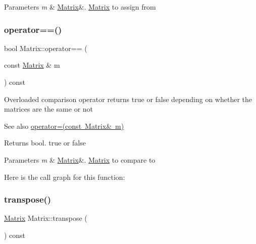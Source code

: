 \begin{DoxyParams}{Parameters}
{\em m} & \mbox{\hyperlink{class_matrix}{Matrix}}\&. \mbox{\hyperlink{class_matrix}{Matrix}} to assign from \\
\hline
\end{DoxyParams}
\mbox{\label{class_matrix_a35097c20bcb1495b57d452db0d7b1f53}} 
\subsubsection{\texorpdfstring{operator==()}{operator==()}}
{\footnotesize\ttfamily bool Matrix\+::operator== (\begin{DoxyParamCaption}\item[{const \mbox{\hyperlink{class_matrix}{Matrix}} \&}]{m }\end{DoxyParamCaption}) const}

Overloaded comparison operator returns true or false depending on whether the matrices are the same or not \begin{DoxySeeAlso}{See also}
\mbox{\hyperlink{class_matrix_aea5a06385f646eb4a63929fae6fa3e14}{operator=(const Matrix\& m)}} 
\end{DoxySeeAlso}
\begin{DoxyReturn}{Returns}
bool. true or false 
\end{DoxyReturn}

\begin{DoxyParams}{Parameters}
{\em m} & \mbox{\hyperlink{class_matrix}{Matrix}}\&. \mbox{\hyperlink{class_matrix}{Matrix}} to compare to \\
\hline
\end{DoxyParams}
Here is the call graph for this function\+:
\mbox{\label{class_matrix_a759661b75b9681f3a89ff75e27933b3a}} 
\subsubsection{\texorpdfstring{transpose()}{transpose()}}
{\footnotesize\ttfamily \mbox{\hyperlink{class_matrix}{Matrix}} Matrix\+::transpose (\begin{DoxyParamCaption}{ }\end{DoxyParamCaption}) const}

